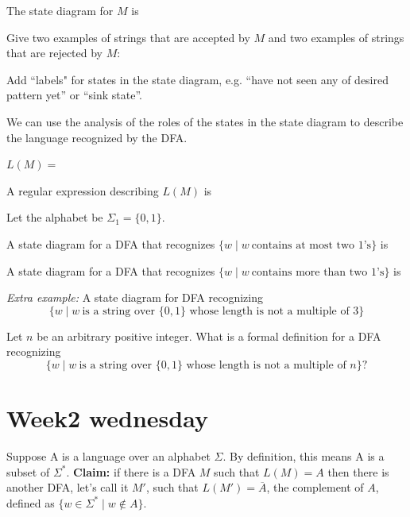 \documentclass[12pt, oneside]{article}
\begin{document}
The state diagram for $M$ is 

\vfill



Give two examples of strings that are accepted by $M$ and two examples of strings that are rejected by $M$:

\vfill

Add ``labels" for states in the state diagram, e.g. ``have not seen any of desired pattern yet'' or
``sink state''.
\newpage

We can use the analysis of the roles of the states in the state diagram to describe the language
recognized by the DFA. 


$L(M) = $

A regular expression describing $L(M)$ is




\vspace{300pt}

Let the alphabet be $\Sigma_1 = \{0,1\}$.

A state diagram for a DFA that recognizes $\{w \mid w~\text{contains at most two $1$'s} \}$ is

\vspace{70pt}

A state diagram for a DFA that recognizes $\{w \mid w~\text{contains more than two $1$'s} \}$ is

\vspace{70pt}


\newpage
{\it Extra example:} A state diagram for DFA recognizing
$$\{w \mid w~\text{is a string over $\{0,1\}$ whose length is not a multiple of $3$} \}$$

\vspace{70pt}


Let $n$ be an arbitrary positive integer. What is a formal definition for a DFA recognizing
\[
\{w \mid w~\text{is a string over $\{0,1\}$ whose length is not a multiple of $n$} \}?
\]

\vspace{70pt} \vfill
\section*{Week2 wednesday}


Suppose A is a language over an alphabet $\Sigma$. By definition, this means A is a subset of $\Sigma^*$.
{\bf Claim:} if there is a DFA $M$ such that $L(M) = A$ then there is another DFA, let's call it $M'$, such that 
$L(M') = \overline{A}$, the complement of $A$, defined as $\{ w \in \Sigma^* \mid w \notin A \}$.
\end{document}
